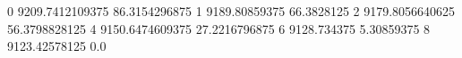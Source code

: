 0 9209.7412109375 86.3154296875
1 9189.80859375 66.3828125
2 9179.8056640625 56.3798828125
4 9150.6474609375 27.2216796875
6 9128.734375 5.30859375
8 9123.42578125 0.0
